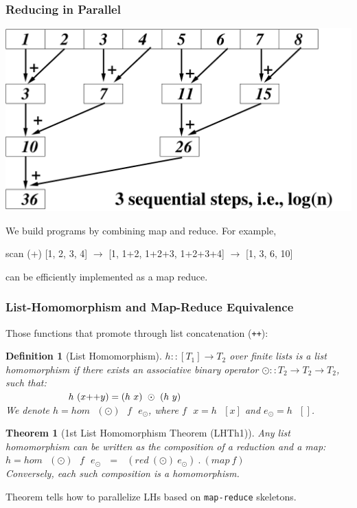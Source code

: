 \documentclass{beamer}
\newcommand{\emp}[1]{\textcolor{DikuRed}{ #1}}
\newtheorem{mydef}{Definition}
\newtheorem{mytheo}{Theorem}
\begin{document}
\begin{frame}
  \frametitle{Reducing in Parallel}

\begin{center} 
        \includegraphics[height=28ex]{ParTeaserFigs/ReduceEg.pdf} 
\end{center} 

We build programs by combining \alert{map} and \alert{reduce}. For example, \smallskip

\emp{scan} (+) [1, 2, 3, 4] $\rightarrow$ [1, 1+2, 1+2+3, 1+2+3+4] $\rightarrow$ [1, 3, 6, 10]\smallskip

can be efficiently implemented as a map reduce.

\end{frame}


\begin{frame}[fragile,t]
  \frametitle{List-Homomorphism and Map-Reduce Equivalence}

Those functions that promote through list concatenation ({\tt ++}):

\begin{mydef}[List Homomorphism]\label{LHomDef}
$h :: [T_1] \rightarrow T_2$ over finite lists is a {\em list homomorphism}
if there exists an associative binary operator $\odot :: T_2 \rightarrow T_2 \rightarrow T_2$,
such that: \\
$\mbox{ }\mbox{ }\mbox{ }\mbox{ }\mbox{ }\mbox{ }\mbox{ }\mbox{ }\mbox{ }$
\emp{$h \mbox{ } (x{\tt ++}y) = (h\mbox{ }x)\mbox{ }\odot\mbox{ }(h\mbox{ }y)$} \\
We denote $h = hom \mbox{ }(\odot) \mbox{ }f\mbox{ }e_{\odot}$, where $f\mbox{ }x = h\mbox{ }[x]$ and $e_{\odot} = h\mbox{ }[]$. 
\end{mydef}


\begin{mytheo}[1st List Homomorphism Theorem (LHTh1)]\label{LHomLema}
Any list homomorphism can be written as the composition
of a reduction and a map:
\emp{$h = hom \mbox{ }(\odot)\mbox{ }f\mbox{ }e_{\odot}\mbox{ }=\mbox{ }(red~(\odot)~e_{\odot})~.~(map~f)$}\\
Conversely, each such composition is a homomorphism.
\end{mytheo}

\bigskip

Theorem tells how to parallelize LHs based on {\tt map-reduce} skeletons.


\end{frame}
\end{document}

